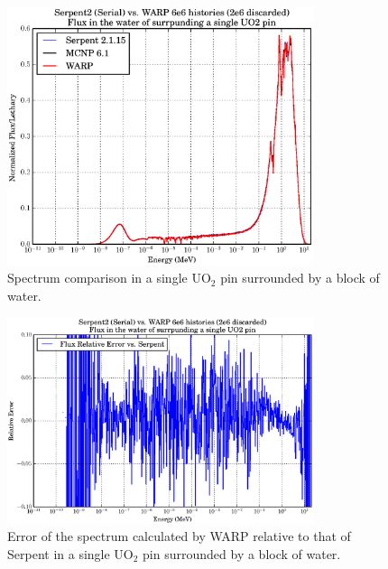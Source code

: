 \begin{figure}[h!] 
\centering
\includegraphics[width=0.8\textwidth]{graphics/finalresults/pincell_spec.eps}
\caption{Spectrum comparison in a single UO$_2$ pin surrounded by a block of water. \label{pincell_spec} }
\end{figure}

\begin{figure}[h!] 
\centering
\includegraphics[width=0.8\textwidth]{graphics/finalresults/pincell_spec_err.eps}
\caption{Error of the spectrum calculated by WARP relative to that of Serpent in a single UO$_2$ pin surrounded by a block of water. \label{pincell_spec_err} }
\end{figure}

